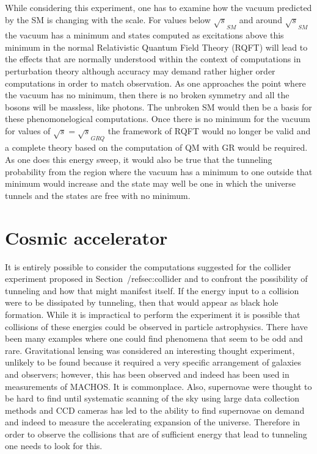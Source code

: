\documentclass[a4paper]{article}
\newcommand{\sms} {\ensuremath{\sqrt{s}_{SM}}}
\newcommand{\spl} {\ensuremath{\sqrt{s}_{SM}}}
\newcommand{\grqs}{\ensuremath{\sqrt{s}_{GRQ}}}
\begin{document}
 While considering this experiment, one has to examine how the vacuum predicted
by the SM is changing with the scale. For values below $\spl$ and around
$\sms$ the vacuum has a minimum and states computed as excitations above
this minimum in the normal Relativistic Quantum Field Theory (RQFT) 
will lead to the effects that are normally understood within the context of
computations in perturbation theory although accuracy may demand rather higher
order computations in order to match observation.  As one approaches the point
where the vacuum has no minimum, then there is no broken symmetry and all
the bosons will be massless, like photons. The unbroken SM would then be
a basis for these phenomonelogical computations.  Once there is no minimum
for the vacuum for values of $\sqrt{s}=\grqs$ the framework of RQFT would
no longer be valid and a complete theory based on the computation of
QM with GR would be required.  As one does this energy sweep, it would
also be true that the tunneling probability from the region where the 
vacuum has a minimum to one outside that minimum would increase and the 
state may well be one in which the universe tunnels and the states are
free with no minimum.

\section{Cosmic accelerator}
\label{sec:accelerator}
It is entirely possible to consider the computations suggested for the collider experiment
proposed in Section~/ref{sec:collider} and to confront the possibility of tunneling and how that
might manifest itself.  If the energy input to a collision were to be dissipated by tunneling, then 
that would appear as black hole formation.  While it is impractical to perform the experiment 
it is possible that collisions of these energies could be observed in particle astrophysics. There
have been many examples where one could find phenomena that seem to be odd and rare.  Gravitational
lensing was considered an interesting thought experiment, unlikely to be found because it required a
very specific arrangement of galaxies and observers; however, this has been observed and indeed has
been used in measurements of MACHOS. It is commonplace. Also, supernovae were thought to be hard to 
find until systematic scanning of the sky using large data collection methods and CCD cameras has
led to the ability to find supernovae on demand and indeed to measure the accelerating expansion of the
universe.  Therefore in order to observe the collisions that are of sufficient energy that
 lead to tunneling  one needs to look for this.  
\end{document}
